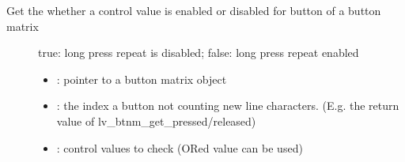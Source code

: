 \documentclass[letterpaper,10pt,english]{sphinxmanual}
\begin{document}
\begin{fulllineitems}
\label{\detokenize{object-types/btnm:_CPPv420lv_btnm_get_btn_ctrlP8lv_obj_t8uint16_t14lv_btnm_ctrl_t}}%
\pysigstartmultiline
{}\label{\detokenize{object-types/btnm:lv__btnm_8h_1a9dc41a4bcec3c210548cbfbe3a1f4706}}%
\pysigstopmultiline
Get the whether a control value is enabled or disabled for button of a button matrix \begin{description}
\item[{}] \leavevmode
true: long press repeat is disabled; false: long press repeat enabled 

\item[{}] \leavevmode\begin{itemize}
\item {} 
: pointer to a button matrix object 

\item {} 
: the index a button not counting new line characters. (E.g. the return value of lv\_btnm\_get\_pressed/released) 

\item {} 
: control values to check (ORed value can be used) 

\end{itemize}

\end{description}


\end{fulllineitems}

\end{document}
